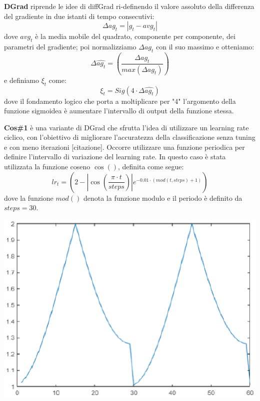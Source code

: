 \textbf{DGrad} riprende le idee di diffGrad ri-definendo il valore assoluto della differenza del gradiente in due istanti di tempo consecutivi:
\begin{equation}
	\Delta ag_{t} = | g_{t}-avg_{t} | 
\end{equation}
dove $avg_{t}$ è la media mobile del quadrato, componente per componente, dei parametri del gradiente; poi normalizziamo $\Delta ag_{t}$ con il suo massimo e otteniamo:
\begin{equation}
	\Delta\hat{ag_{t}} = \left(\frac{\Delta ag_{t}}{max(\Delta ag_{t})} \right)
\end{equation}
e definiamo $\xi_{t}$ come:
\begin{equation}
	\xi_{t} = Sig(4 \cdot \Delta \hat{ag_{t}})
\end{equation}
dove il fondamento logico che porta a moltiplicare per "4" l'argomento della funzione sigmoidea è aumentare l'intervallo di output della funzione stessa.

\textbf{Cos\#1} è una variante di DGrad che sfrutta l'idea di utilizzare un learning rate ciclico, con l'obiettivo di migliorare l'accuratezza della classificazione senza tuning e con meno iterazioni [citazione].
Occorre utilizzare una funzione periodica per definire l'intervallo di variazione del learning rate. In questo caso è stata utilizzata la funzione coseno $\cos()$, definita come segue:
\begin{equation}
	lr_{t} = \left(2-\left\lvert\cos\left(\frac{\pi \cdot t}{steps}\right)\right\rvert e^{-0.01 \cdot (mod(t,steps)+1)}\right)
\end{equation}
dove la funzione $mod()$ denota la funzione modulo e il periodo è definito da $steps=30$.

\vspace{0.25cm} 
\begin{center}
	\includegraphics[scale=0.5]{images/clr.eps} %
	\label{Figura 1.}
\end{center}
\vspace{0.25cm}

